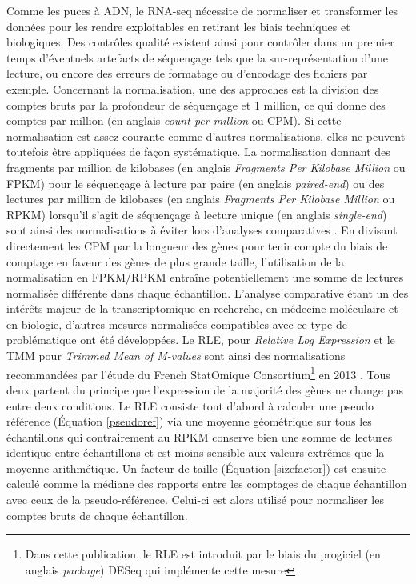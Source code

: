 Comme les puces à ADN, le RNA-seq nécessite de normaliser et transformer les données pour les rendre exploitables en retirant les biais techniques et biologiques. Des contrôles qualité existent ainsi pour contrôler dans un premier temps d'éventuels artefacts de séquençage tels que la sur-représentation d'une lecture, ou encore des erreurs de formatage ou d'encodage des fichiers par exemple. Concernant la normalisation, une des approches est la division des comptes bruts par la profondeur de séquençage et 1 million, ce qui donne des comptes par million (en anglais \textit{count per million} ou CPM). Si cette normalisation est assez courante comme d'autres normalisations, elles ne peuvent toutefois être appliquées de façon systématique. La normalisation donnant des fragments par million de kilobases (en anglais \textit{Fragments Per Kilobase Million} ou FPKM) pour le séquençage à lecture par paire (en anglais \textit{paired-end}) ou des lectures par million de kilobases (en anglais \textit{Fragments Per Kilobase Million} ou RPKM) lorsqu'il s'agit de séquençage à lecture unique (en anglais \textit{single-end}) sont ainsi des normalisations à éviter lors d'analyses comparatives \cite{Wagner2012Dec}. En divisant directement les CPM par la longueur des gènes pour tenir compte du biais de comptage en faveur des gènes de plus grande taille, l'utilisation de la normalisation en FPKM/RPKM entraîne potentiellement une somme de lectures normalisée différente dans chaque échantillon. L'analyse comparative étant un des intérêts majeur de la transcriptomique en recherche, en médecine moléculaire et en biologie, d'autres mesures normalisées compatibles avec ce type de problématique ont été développées. Le RLE, pour \textit{Relative Log Expression} \cite{Anders2010Oct} et le TMM pour \textit{Trimmed Mean of M-values} \cite{Robinson2010Mar} sont ainsi des normalisations recommandées par l'étude du French StatOmique Consortium\footnote{Dans cette publication, le RLE est introduit par le biais du progiciel (en anglais \textit{package}) DESeq \cite{Anders2010Oct} qui implémente cette mesure} en 2013 \cite{Dillies2013Nov}. Tous deux partent du principe que l'expression de la majorité des gènes ne change pas entre deux conditions. Le RLE consiste tout d'abord à calculer une pseudo référence (Équation \ref{pseudoref}) via une moyenne géométrique sur tous les échantillons \cite{Gandolfo2018Feb} qui contrairement au RPKM conserve bien une somme de lectures identique entre échantillons et est moins sensible aux valeurs extrêmes que la moyenne arithmétique. Un facteur de taille (Équation \ref{sizefactor}) est ensuite calculé comme la médiane des rapports entre les comptages de chaque échantillon avec ceux de la pseudo-référence. Celui-ci est alors utilisé pour normaliser les comptes bruts de chaque échantillon.

